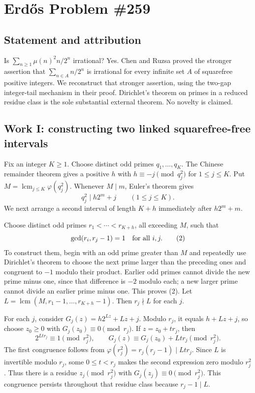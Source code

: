 \section{Erd\H{o}s Problem \#259}
\subsection{Statement and attribution}
Is $\sum_{n\ge1}\mu(n)^2n/2^n$ irrational? Yes. Chen and Ruzsa proved the stronger assertion that $\sum_{n\in A}n/2^n$ is irrational for every infinite set $A$ of squarefree positive integers. We reconstruct that stronger assertion, using the two-gap integer-tail mechanism in their proof. Dirichlet's theorem on primes in a reduced residue class is the sole substantial external theorem. No novelty is claimed.

\subsection{Work I: constructing two linked squarefree-free intervals}
Fix an integer $K\ge1$. Choose distinct odd primes $q_1,\ldots,q_K$. The Chinese remainder theorem gives a positive $h$ with
$h\equiv-j\pmod{q_j^2}$ for $1\le j\le K$. Put
$M=\operatorname{lcm}_{j\le K}\varphi(q_j^2)$. Whenever $M\mid m$, Euler's theorem gives
\[
 q_j^2\mid h2^m+j\qquad(1\le j\le K).
 \tag{1}
\]
We next arrange a second interval of length $K+h$ immediately after $h2^m+m$.

Choose distinct odd primes $r_1<\cdots<r_{K+h}$, all exceeding $M$, such that
\[
 \gcd(r_i,r_j-1)=1\quad\hbox{for all }i,j.
 \tag{2}
\]
To construct them, begin with an odd prime greater than $M$ and repeatedly use Dirichlet's theorem to choose the next prime larger than the preceding ones and congruent to $-1$ modulo their product. Earlier odd primes cannot divide the new prime minus one, since that difference is $-2$ modulo each; a new larger prime cannot divide an earlier prime minus one. This proves (2).
Let $L=\operatorname{lcm}(M,r_1-1,\ldots,r_{K+h}-1)$. Then $r_j\nmid L$ for each $j$.

For each $j$, consider
$G_j(z)=h2^{Lz}+Lz+j$. Modulo $r_j$, it equals $h+Lz+j$, so choose $z_0\ge0$ with $G_j(z_0)\equiv0\pmod{r_j}$. If $z=z_0+tr_j$, then
\[
 2^{Ltr_j}\equiv1\pmod{r_j^2},\qquad
 G_j(z)\equiv G_j(z_0)+Ltr_j\pmod{r_j^2}.
\]
The first congruence follows from $\varphi(r_j^2)=r_j(r_j-1)\mid Ltr_j$. Since $L$ is invertible modulo $r_j$, some $0\le t<r_j$ makes the second expression zero modulo $r_j^2$. Thus there is a residue $z_j\pmod{r_j^2}$ with $G_j(z_j)\equiv0\pmod{r_j^2}$. This congruence persists throughout that residue class because $r_j-1\mid L$.

